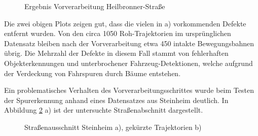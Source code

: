 \begin{figure}[H]
    \centering
    \qquad \qquad
    \caption{Ergebnis Vorverarbeitung Heilbronner-Straße}
    \label{fig:results_prePro_heilbronner}
\end{figure}

Die zwei obigen Plots zeigen gut, dass die vielen in a) vorkommenden Defekte entfernt wurden. Von den
circa 1050 Roh-Trajektorien im ursprünglichen Datensatz bleiben nach der Vorverarbeitung etwa 450 intakte
Bewegungsbahnen übrig. Die Mehrzahl der Defekte in diesem Fall stammt von fehlerhaften Objekterkennungen
und unterbrochener Fahrzeug-Detektionen, welche aufgrund der Verdeckung von Fahrspuren durch Bäume entstehen.

Ein problematisches Verhalten des Vorverarbeitungsschrittes wurde beim Testen der Spurerkennung anhand eines
Datensatzes aus Steinheim deutlich. In Abbildung \ref{fig:results_horizon_problem} a) ist der
untersuchte Straßenabschnitt dargestellt.

\begin{figure}[H]
    \centering
    \qquad \qquad \qquad
    \caption{Straßenausschnitt Steinheim a), gekürzte Trajektorien b)}
    \label{fig:results_horizon_problem}
\end{figure}

